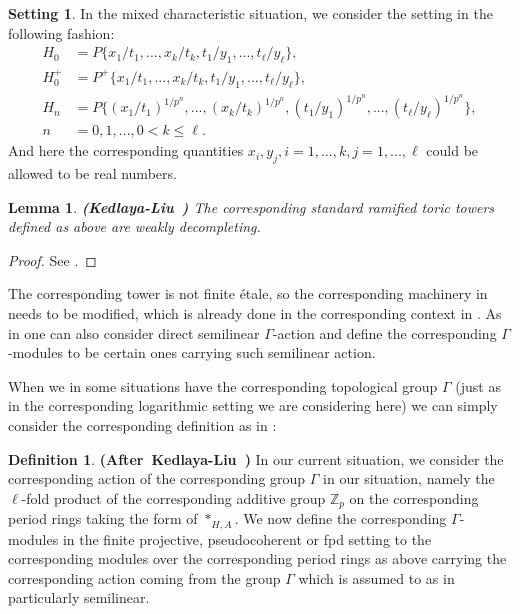 \documentclass[12pt]{amsart}
\newtheorem{lemma}[theorem]{Lemma}
\theoremstyle{definition}
\newtheorem{definition}[theorem]{Definition}
\numberwithin{equation}{section}
\newtheorem{setting}[theorem]{Setting}
\begin{document}
\begin{setting}
In the mixed characteristic situation, we consider the setting in the following fashion:
\begin{align}
H_0&=P\{x_1/t_1,...,x_k/t_k,t_1/y_1,...,t_\ell/y_\ell\},\\
H_0^+&=P^+\{x_1/t_1,...,x_k/t_k,t_1/y_1,...,t_\ell/y_\ell\},\\
H_n&=P\{(x_1/t_1)^{1/p^n},...,(x_k/t_k)^{1/p^n},(t_1/y_1)^{1/p^n},...,(t_\ell/y_\ell)^{1/p^n}\},\\
n&=0,1,..., 0<k\leq\ell.	
\end{align}		
And here the corresponding quantities $x_i,y_j,i=1,...,k,j=1,...,\ell$ could be allowed to be real numbers.
\end{setting}



\begin{lemma} \mbox{\bf{(Kedlaya-Liu \cite[Lemma 7.3.3]{KL16})}}
The corresponding standard ramified toric towers defined as above are weakly decompleting.	
\end{lemma}

\begin{proof}
See \cite[Lemma 7.3.3]{KL16}.	
\end{proof}




\indent The corresponding tower is not finite \'etale, so the corresponding machinery in \cite[Chapter 5]{KL16} needs to be modified, which is already done in the corresponding context in \cite[Chapter 7]{KL16}. As in \cite[Chapter 7, Section 3, Section 4]{KL16} one can also consider direct semilinear $\Gamma$-action and define the corresponding $\Gamma$-modules to be certain ones carrying such semilinear action.


\indent  When we in some situations have the corresponding topological group $\Gamma$ (just as in the corresponding logarithmic setting we are considering here) we can simply consider the corresponding definition as in \cite[Definition 7.3.5]{KL16}:


\begin{definition} \mbox{\bf{(After Kedlaya-Liu \cite[Definition 7.3.5]{KL16})}}
In our current situation, we consider the corresponding action of the corresponding group $\Gamma$ in our situation, namely the $\ell$-fold product of the corresponding additive group $\mathbb{Z}_p$ on the corresponding period rings taking the form of $*_{H,A}$. We now define the corresponding $\Gamma$-modules in the finite projective, pseudocoherent or fpd setting to the corresponding modules over the corresponding period rings as above carrying the corresponding action coming from the group $\Gamma$ which is assumed to as in \cite[Definition 7.3.5]{KL16} particularly semilinear. 	
\end{definition}
\end{document}
